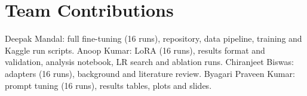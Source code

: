 \documentclass[11pt]{article}
\begin{document}
\section*{Team Contributions}

Deepak Mandal: full fine-tuning (16 runs), repository, data pipeline, training and Kaggle run scripts. Anoop Kumar: LoRA (16 runs), results format and validation, analysis notebook, LR search and ablation runs. Chiranjeet Biswas: adapters (16 runs), background and literature review. Byagari Praveen Kumar: prompt tuning (16 runs), results tables, plots and slides.


\end{document}
